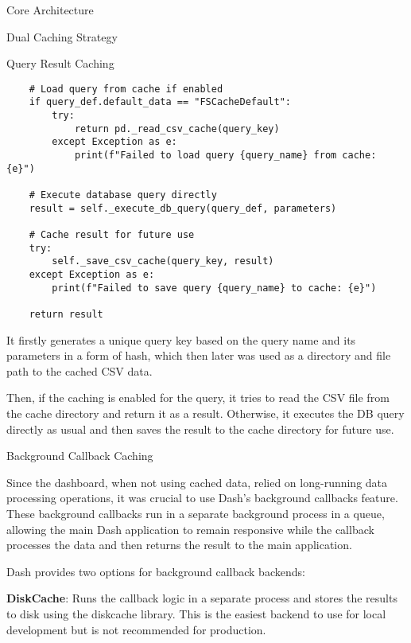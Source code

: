 \begin{section}{Core Architecture}
\begin{subsection}{Dual Caching Strategy}
\begin{subsubsection}{Query Result Caching}
\begin{listing}[h]
\begin{verbatim}
	# Load query from cache if enabled
    if query_def.default_data == "FSCacheDefault":
        try:
            return pd._read_csv_cache(query_key)
        except Exception as e:
            print(f"Failed to load query {query_name} from cache: {e}")

    # Execute database query directly
    result = self._execute_db_query(query_def, parameters)

    # Cache result for future use
    try:
        self._save_csv_cache(query_key, result)
    except Exception as e:
        print(f"Failed to save query {query_name} to cache: {e}")

    return result
				\end{verbatim}
				\label{lst:dashboard-implementation-query-cache}
			\end{listing}

			It firstly generates a unique query key based on the query name and its parameters in a form of hash, which then later was used as a directory and file path to the cached CSV data.

			Then, if the caching is enabled for the query, it tries to read the CSV file from the cache directory and return it as a result.
			Otherwise, it executes the DB query directly as usual and then saves the result to the cache directory for future use.
		\end{subsubsection}

		\vspace*{\fill}\pagebreak[4] %

		\begin{subsubsection}{Background Callback Caching}
			\label{subsubsec:implementation-core-architecture-callback-cache}

			Since the dashboard, when not using cached data, relied on long-running data processing operations, it was crucial to use Dash's background callbacks feature.
			These background callbacks run in a separate background process in a queue,
			allowing the main Dash application to remain responsive while the callback processes the data and then returns the result to the main application\cite{plotly_dash_plotly_com_background_callbacks}.

			Dash provides two options for background callback backends:

			\textbf{DiskCache}: Runs the callback logic in a separate process and stores the results to disk using the diskcache library.
			This is the easiest backend to use for local development but is not recommended for production.


\end{subsubsection}
\end{subsection}
\end{section}

